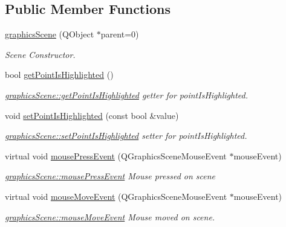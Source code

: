 \subsection*{Public Member Functions}
\begin{DoxyCompactItemize}
\item 
\mbox{\hyperlink{classgraphics_scene_a630f565d827637e6f46f5ae2e786cd06}{graphics\+Scene}} (Q\+Object $\ast$parent=0)
\begin{DoxyCompactList}\small\item\em Scene Constructor. \end{DoxyCompactList}\item 
bool \mbox{\hyperlink{classgraphics_scene_ab84d166160c74279bae4f59c2ccac244}{get\+Point\+Is\+Highlighted}} ()
\begin{DoxyCompactList}\small\item\em \mbox{\hyperlink{classgraphics_scene_ab84d166160c74279bae4f59c2ccac244}{graphics\+Scene\+::get\+Point\+Is\+Highlighted}} getter for point\+Is\+Highlighted. \end{DoxyCompactList}\item 
void \mbox{\hyperlink{classgraphics_scene_a96915f909391e379b8c6c880d1d3acc6}{set\+Point\+Is\+Highlighted}} (const bool \&value)
\begin{DoxyCompactList}\small\item\em \mbox{\hyperlink{classgraphics_scene_a96915f909391e379b8c6c880d1d3acc6}{graphics\+Scene\+::set\+Point\+Is\+Highlighted}} setter for point\+Is\+Highlighted. \end{DoxyCompactList}\item 
virtual void \mbox{\hyperlink{classgraphics_scene_a45ca641319ec6accb1574f52539e7517}{mouse\+Press\+Event}} (Q\+Graphics\+Scene\+Mouse\+Event $\ast$mouse\+Event)
\begin{DoxyCompactList}\small\item\em \mbox{\hyperlink{classgraphics_scene_a45ca641319ec6accb1574f52539e7517}{graphics\+Scene\+::mouse\+Press\+Event}} Mouse pressed on scene \end{DoxyCompactList}\item 
virtual void \mbox{\hyperlink{classgraphics_scene_a08bfd268527873e3bccaa52f34823058}{mouse\+Move\+Event}} (Q\+Graphics\+Scene\+Mouse\+Event $\ast$mouse\+Event)
\begin{DoxyCompactList}\small\item\em \mbox{\hyperlink{classgraphics_scene_a08bfd268527873e3bccaa52f34823058}{graphics\+Scene\+::mouse\+Move\+Event}} Mouse moved on scene. \end{DoxyCompactList}\end{DoxyCompactItemize}


